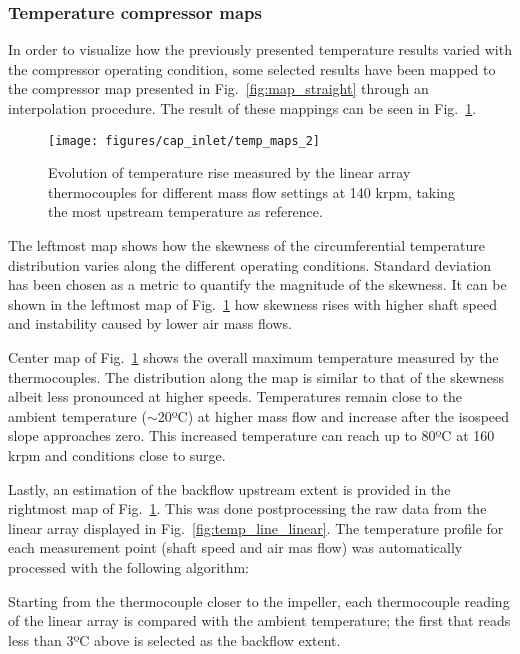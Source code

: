\subsubsection{Temperature compressor maps}

In order to visualize how the previously presented temperature results varied with the compressor operating condition, some selected results have been mapped to the compressor map presented in Fig.~\ref{fig:map_straight} through an interpolation procedure. The result of these mappings can be seen in Fig.~\ref{fig:temp_maps}.

\begin{figure}[htb!]
\centering
\texttt{[image: figures/cap\_inlet/temp\_maps\_2]}
\caption[Maps of temperature results]{Evolution of temperature rise measured by the linear array thermocouples for different mass flow settings at 140 krpm, taking the most upstream temperature as reference.}
\label{fig:temp_maps}
\end{figure}

The leftmost map shows how the skewness of the circumferential temperature distribution varies along the different operating conditions. Standard deviation has been chosen as a metric to quantify the magnitude of the skewness. It can be shown in the leftmost map of Fig.~\ref{fig:temp_maps} how skewness rises with higher shaft speed and instability caused by lower air mass flows.

Center map of Fig.~\ref{fig:temp_maps} shows the overall maximum temperature measured by the thermocouples. The distribution along the map is similar to that of the skewness albeit less pronounced at higher speeds. Temperatures remain close to the ambient temperature ($\sim$20ºC) at higher mass flow and increase after the isospeed slope approaches zero. This increased temperature can reach up to 80ºC at 160 krpm and conditions close to surge.

Lastly, an estimation of the backflow upstream extent is provided in the rightmost map of Fig.~\ref{fig:temp_maps}. This was done postprocessing the raw data from the linear array displayed in Fig.~\ref{fig:temp_line_linear}. The temperature profile for each measurement point (shaft speed and air mas flow) was automatically processed with the following algorithm:

Starting from the thermocouple closer to the impeller, each thermocouple reading of the linear array is compared with the ambient temperature; the first that reads less than 3ºC above is selected as the backflow extent.

